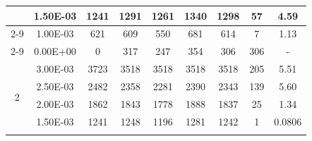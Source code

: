 \begin{table}[H]
{\begin{tabular}{|c|c|c|c|c|c|c|c|c|}
                               & 1.50E-03         & 1241      & 1291                                                       & 1261                                                      & 1340                                                      & 1298    & 57     & 4.59                                                               \\ \cline{2-9}
                               & 1.00E-03         & 621       & 609                                                        & 550                                                       & 681                                                       & 614     & 7      & 1.13                                                               \\ \cline{2-9}
                               & 0.00E+00         & 0         & 317                                                        & 247                                                       & 354                                                       & 306     & 306    & -                                                                  \\ \hline
            \multirow{6}{*}{2} & 3.00E-03         & 3723      & 3518                                                       & 3518                                                      & 3518                                                      & 3518    & 205    & 5.51                                                               \\ \cline{2-9}
                               & 2.50E-03         & 2482      & 2358                                                       & 2281                                                      & 2390                                                      & 2343    & 139    & 5.60                                                               \\ \cline{2-9}
                               & 2.00E-03         & 1862      & 1843                                                       & 1778                                                      & 1888                                                      & 1837    & 25     & 1.34                                                               \\ \cline{2-9}
                               & 1.50E-03         & 1241      & 1248                                                       & 1196                                                      & 1281                                                      & 1242    & 1      & 0.0806                                                             \\ \cline{2-9}

\end{tabular}}
\end{table}
